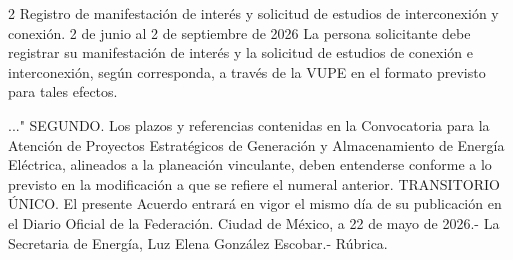  2
 Registro de manifestación de interés y solicitud de estudios de interconexión y conexión.
 2 de junio al 2 de septiembre de 2026
 La persona solicitante debe registrar su manifestación de interés y la solicitud de estudios de conexión e interconexión, según corresponda, a través de la VUPE en el formato previsto para tales efectos.
 
 
..."
SEGUNDO. Los plazos y referencias contenidas en la Convocatoria para la Atención de Proyectos Estratégicos de Generación y Almacenamiento de Energía Eléctrica, alineados a la planeación vinculante, deben entenderse conforme a lo previsto en la modificación a que se refiere el numeral anterior.
TRANSITORIO
ÚNICO. El presente Acuerdo entrará en vigor el mismo día de su publicación en el Diario Oficial  de la Federación.
Ciudad de México, a 22 de mayo de 2026.- La Secretaria de Energía, Luz Elena González Escobar.- Rúbrica.\par
\endgroup
